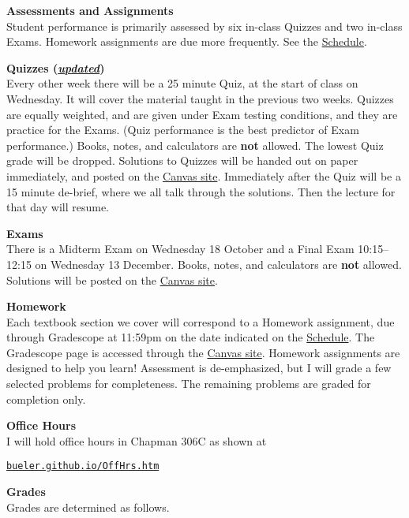 \documentclass[12pt]{article}
\renewcommand{\emph}[1]{\textsf{\textbf{#1}}}
\newcommand{\localhead}[1]{\par\smallskip\textbf{#1}\nobreak\\}%
\def\heading#1{\localhead{\large\emph{#1}}}
\def\subheading#1{\localhead{\emph{#1}}}
\begin{document}
\heading{Assessments and Assignments}
Student performance is primarily assessed by six in-class Quizzes and two in-class Exams.  Homework assignments are due more frequently.  See the \href{https://bueler.github.io/math302/assets/general/F23/schedule.pdf}{Schedule}.
 

\subheading{Quizzes (\underline{\textsl{updated}})}
Every other week there will be a 25 minute Quiz, at the start of class on Wednesday.  It will cover the material taught in the previous two weeks.  Quizzes are equally weighted, and are given under Exam testing conditions, and they are practice for the Exams.  (Quiz performance is the best predictor of Exam performance.)  Books, notes, and calculators are \emph{not} allowed.  The lowest Quiz grade will be dropped.  Solutions to Quizzes will be handed out on paper immediately, and posted on the \href{https://canvas.alaska.edu/courses/16214}{Canvas site}.  Immediately after the Quiz will be a 15 minute de-brief, where we all talk through the solutions.  Then the lecture for that day will resume.


\subheading{Exams}
There is a Midterm Exam on Wednesday 18 October and a Final Exam 10:15--12:15 on Wednesday 13 December.   Books, notes, and calculators are \emph{not} allowed.  Solutions will be posted on the \href{https://canvas.alaska.edu/courses/16214}{Canvas site}.


\subheading{Homework}
Each textbook section we cover will correspond to a Homework assignment, due through Gradescope at 11:59pm on the date indicated on the \href{https://bueler.github.io/math302/assets/general/F23/schedule.pdf}{Schedule}.  The Gradescope page is accessed through the \href{https://canvas.alaska.edu/courses/16214}{Canvas site}.  Homework assignments are designed to help you learn!  Assessment is de-emphasized, but I will grade a few selected problems for completeness.  The remaining problems are graded for completion only.  


\heading{Office Hours}
I will hold office hours in Chapman 306C as shown at

\smallskip
\centerline{\href{http://bueler.github.io/OffHrs.htm}{\tt bueler.github.io/OffHrs.htm}}


\clearpage\newpage
\heading{Grades}
Grades are determined as follows.
\end{document}
